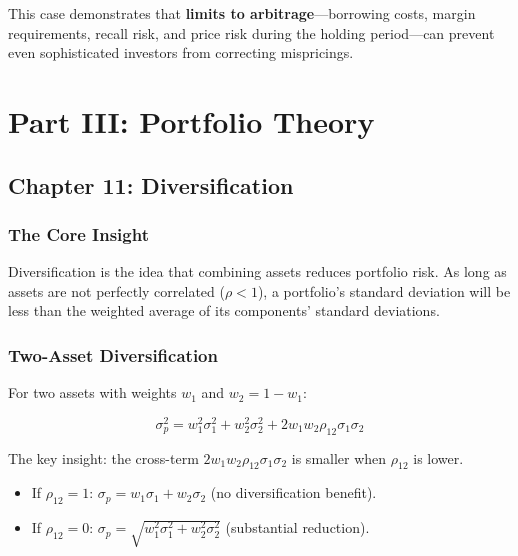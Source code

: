 \documentclass[11pt,letterpaper]{report}
\begin{document}
This case demonstrates that \textbf{limits to arbitrage}---borrowing costs, margin requirements, recall risk, and price risk during the holding period---can prevent even sophisticated investors from correcting mispricings.


\part{Part III: Portfolio Theory}



\chapter{Chapter 11: Diversification}


\section{The Core Insight}


Diversification is the idea that combining assets reduces portfolio risk.  As long as assets are not perfectly correlated ($\rho < 1$), a portfolio's standard deviation will be less than the weighted average of its components' standard deviations.

\section{Two-Asset Diversification}


For two assets with weights $w_1$ and $w_2 = 1 - w_1$:

$$\sigma_p^2 = w_1^2 \sigma_1^2 + w_2^2 \sigma_2^2 + 2 w_1 w_2 \rho_{12} \sigma_1 \sigma_2$$

The key insight: the cross-term $2 w_1 w_2 \rho_{12} \sigma_1 \sigma_2$ is smaller when $\rho_{12}$ is lower.

\begin{itemize}
  \item If $\rho_{12} = 1$: $\sigma_p = w_1 \sigma_1 + w_2 \sigma_2$ (no diversification benefit).
  \item If $\rho_{12} = 0$: $\sigma_p = \sqrt{w_1^2 \sigma_1^2 + w_2^2 \sigma_2^2}$ (substantial reduction).
\end{itemize}

\begin{center}
\end{center}
\end{document}
